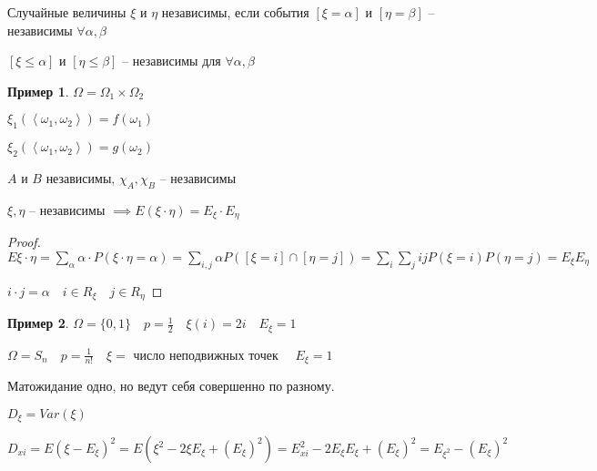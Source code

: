 \documentclass{book}
\theoremstyle{definition}
\newtheorem*{example}{Пример}
\begin{document}
\begin{definition}
    [удобное]
    Случайные величины  $\xi$ и  $\eta$ независимы, если события  $[\xi = \alpha]$ и $\left[ \eta = \beta \right] $ -- независимы $\forall \alpha, \beta$
\end{definition}

\begin{definition}
    [нормальное]

    $[\xi\leqslant \alpha]$ и $\left[ \eta\leqslant \beta \right] $ -- независимы для $\forall \alpha, \beta$
\end{definition}

\begin{example}
    $\Omega = \Omega_1 \times  \Omega_2$

    $\xi_1\left( \left<\omega_1, \omega_2 \right> \right)  = f\left( \omega_1 \right) $

    $\xi_2\left( \left<\omega_1, \omega_2 \right> \right) = g\left( \omega_2 \right) $

    $A$ и  $B$ независимы, $\chi_A, \chi_B$ -- независимы
\end{example}

\begin{theorem}
    $\xi, \eta$ -- независимы  $\implies E\left( \xi\cdot \eta \right)  = E_{\xi} \cdot  E_{\eta}$
\end{theorem}
\begin{proof}
    $E \xi\cdot \eta = \sum_{\alpha} \alpha\cdot P\left( \xi\cdot \eta = \alpha \right)  = \sum_{i, j}\alpha P\left( \left[ \xi = i \right] \cap  \left[ \eta = j \right]  \right)  = \sum_i\sum_j i j P\left( \xi = i \right) P\left( \eta = j \right)  = E_{\xi}E_{\eta}$

    $i\cdot j = \alpha\quad i\in R_{\xi}\quad j\in R_{\eta}$
\end{proof}

\begin{example}
    $\Omega = \{0,1\}\quad p = \frac{1}{2}\quad \xi(i) = 2i\quad E_{\xi} = 1$ 

    $\Omega = S_n\quad p = \frac{1}{n!}\quad \xi = $ число неподвижных точек $\quad E_{\xi} = 1$

    Матожидание одно, но ведут себя совершенно по разному.
\end{example}

\begin{definition}
    [Дисперсия]

    $D_{\xi} = Var\left( \xi \right) $ 

    $D_{xi} = E\left( \xi-E_{\xi} \right) ^2  =E\left( \xi^2 - 2\xi E_{\xi} + \left( E_{\xi} \right) ^2 \right)  = E_{xi}^2 - 2E_{\xi}E_{\xi} + \left( E_{\xi} \right) ^2 = E_{\xi^2} - \left( E_{\xi} \right) ^2$
\end{definition}
\end{document}
